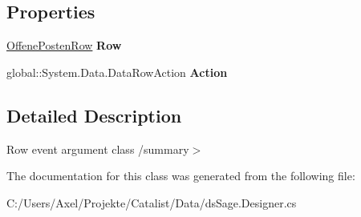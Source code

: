 \subsection*{Properties}
\begin{DoxyCompactItemize}
\item 
\hyperlink{class_products_1_1_data_1_1ds_sage_1_1_offene_posten_row}{Offene\+Posten\+Row} {\bfseries Row}\hypertarget{class_products_1_1_data_1_1ds_sage_1_1_offene_posten_row_change_event_a41e9ed7848625af7212251afe1db7950}{}\label{class_products_1_1_data_1_1ds_sage_1_1_offene_posten_row_change_event_a41e9ed7848625af7212251afe1db7950}

\item 
global\+::\+System.\+Data.\+Data\+Row\+Action {\bfseries Action}\hypertarget{class_products_1_1_data_1_1ds_sage_1_1_offene_posten_row_change_event_acf4ef8b352c7fb80c05d403dd005fecf}{}\label{class_products_1_1_data_1_1ds_sage_1_1_offene_posten_row_change_event_acf4ef8b352c7fb80c05d403dd005fecf}

\end{DoxyCompactItemize}


\subsection{Detailed Description}
Row event argument class /summary$>$ 

The documentation for this class was generated from the following file\+:\begin{DoxyCompactItemize}
\item 
C\+:/\+Users/\+Axel/\+Projekte/\+Catalist/\+Data/ds\+Sage.\+Designer.\+cs\end{DoxyCompactItemize}
